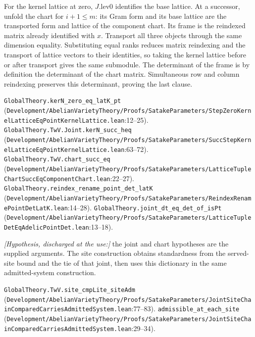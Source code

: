 For the kernel lattice at zero, $J.\mathrm{lev0}$ identifies the base lattice. At a successor, unfold the chart for $i+1\le m$: its Gram form and its base lattice are the transported form and lattice of the component chart. Its frame is the reindexed matrix already identified with $x$. Transport all three objects through the same dimension equality. Substituting equal ranks reduces matrix reindexing and the transport of lattice vectors to their identities, so taking the kernel lattice before or after transport gives the same submodule. The determinant of the frame is by definition the determinant of the chart matrix. Simultaneous row and column reindexing preserves this determinant, proving the last clause.
\par{\footnotesize \nolinkurl{GlobalTheory.kerN_zero_eq_latK_pt} (\nolinkurl{Development/AbelianVarietyTheory/Proofs/SatakeParameters/StepZeroKernelLatticeEqPointKernelLattice.lean}\allowbreak:12--25). \nolinkurl{GlobalTheory.TwV.Joint.kerN_succ_heq} (\nolinkurl{Development/AbelianVarietyTheory/Proofs/SatakeParameters/SuccStepKernelLatticeEqPointKernelLattice.lean}\allowbreak:63--72). \nolinkurl{GlobalTheory.TwV.chart_succ_eq} (\nolinkurl{Development/AbelianVarietyTheory/Proofs/SatakeParameters/LatticeTupleChartSuccEqComponentChart.lean}\allowbreak:22--27). \nolinkurl{GlobalTheory.reindex_rename_point_det_latK} (\nolinkurl{Development/AbelianVarietyTheory/Proofs/SatakeParameters/ReindexRenamePointDetLatK.lean}\allowbreak:14--28). \nolinkurl{GlobalTheory.joint_dt_eq_det_of_isPt} (\nolinkurl{Development/AbelianVarietyTheory/Proofs/SatakeParameters/LatticeTupleDetEqAdelicPointDet.lean}\allowbreak:13--18).\par}

\textit{[Hypothesis, discharged at the use:]} the joint and chart hypotheses are the supplied arguments. The site construction obtains standardness from the served-site bound and the tie of that joint, then uses this dictionary in the same admitted-system construction.
\par{\footnotesize \nolinkurl{GlobalTheory.TwV.site_cmpLite_siteAdm} (\nolinkurl{Development/AbelianVarietyTheory/Proofs/SatakeParameters/JointSiteChainComparedCarriesAdmittedSystem.lean}\allowbreak:77--83). \nolinkurl{admissible_at_each_site} (\nolinkurl{Development/AbelianVarietyTheory/Proofs/SatakeParameters/JointSiteChainComparedCarriesAdmittedSystem.lean}\allowbreak:29--34).\par}

